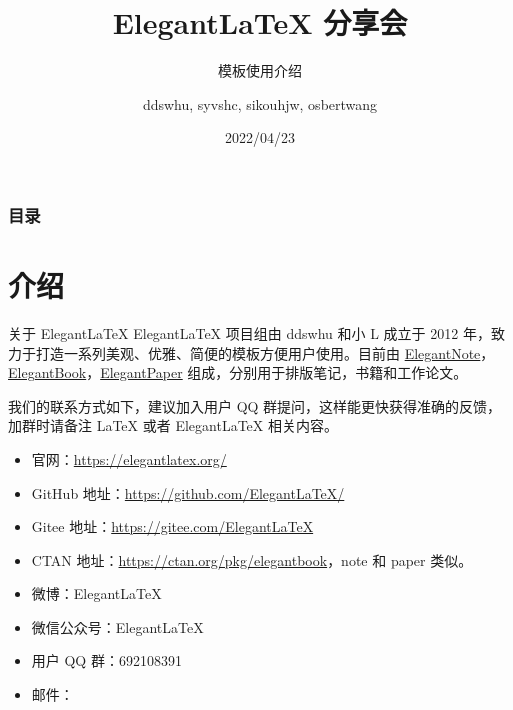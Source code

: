 \documentclass[8pt]{beamer}
\author{ddswhu, syvshc, sikouhjw, osbertwang}
\title{Elegant\LaTeX{} 分享会}
\subtitle{模板使用介绍}
\institute{ElegantLaTeX Program}
\date{2022/04/23}
\begin{document}
\maketitle


\begin{frame}\frametitle{目录}
\tableofcontents[hideallsubsections]

\end{frame}


\section{介绍}

\begin{frame}{关于 ElegantLaTeX}
Elegant\LaTeX{} 项目组由 \textcolor{iron}{ddswhu} 和\textcolor{iron}{小 L} 成立于 2012 年，致力于打造一系列美观、优雅、简便的模板方便用户使用。目前由 \href{https://github.com/ElegantLaTeX/ElegantNote}{ElegantNote}，\href{https://github.com/ElegantLaTeX/ElegantBook}{ElegantBook}，\href{https://github.com/ElegantLaTeX/ElegantPaper}{ElegantPaper} 组成，分别用于排版笔记，书籍和工作论文。

我们的联系方式如下，建议加入用户 QQ 群提问，这样能更快获得准确的反馈，加群时请备注 \LaTeX{} 或者 Elegant\LaTeX{} 相关内容。
\begin{itemize}
  \item 官网：\href{https://elegantlatex.org/}{https://elegantlatex.org/}
  \item GitHub 地址：\href{https://github.com/ElegantLaTeX/}{https://github.com/ElegantLaTeX/}
  \item Gitee 地址：\href{https://gitee.com/ElegantLaTeX}{https://gitee.com/ElegantLaTeX}
  \item CTAN 地址：\href{https://ctan.org/pkg/elegantbook}{https://ctan.org/pkg/elegantbook}，note 和 paper 类似。
  \item 微博：Elegant\LaTeX{}
  \item 微信公众号：Elegant\LaTeX{}
  \item 用户 QQ 群：692108391
  \item 邮件：
\end{itemize}
\end{frame}
\end{document}
